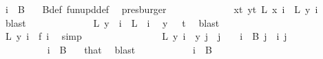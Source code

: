\begin{isabellebody}
\ {\isacartoucheopen}i\ {\isasymin}\ B\ {}{\isacartoucheclose}\ \isamarkupfalse%
\ B{\isacharunderscore}{\kern0pt}def\ fun{\isacharunderscore}{\kern0pt}upd{\isacharunderscore}{\kern0pt}def\ \isamarkupfalse%
\ presburger\isanewline
\ \ \ \ \ \ \ \ \ \ \isamarkupfalse%
\ \isamarkupfalse%
\ {\isachardoublequoteopen}{\isacharparenleft}{\kern0pt}{\isasymforall}x{\isacharless}{\kern0pt}t{\isachardot}{\kern0pt}\ {\isasymforall}y{\isacharless}{\kern0pt}t{\isachardot}{\kern0pt}\ L\ x\ i\ {\isacharequal}{\kern0pt}\ L\ y\ i{\isacharparenright}{\kern0pt}{\isachardoublequoteclose}\ \isamarkupfalse%
\ blast\isanewline
\ \ \ \ \ \ \ \ \ \ \isamarkupfalse%
\ \isamarkupfalse%
\ {\isachardoublequoteopen}L\ {\isacharparenleft}{\kern0pt}y\ {}{\isacharparenright}{\kern0pt}\ i\ {\isacharequal}{\kern0pt}\ L\ {}\ i{\isachardoublequoteclose}\ \isamarkupfalse%
\ {\isacartoucheopen}y\ {}\ {\isasymin}\ {\isacharbraceleft}{\kern0pt}{\isachardot}{\kern0pt}{\isachardot}{\kern0pt}{\isacharless}{\kern0pt}t{\isacharbraceright}{\kern0pt}{\isacartoucheclose}\ \isamarkupfalse%
\ blast\isanewline
\ \ \ \ \ \ \ \ \isamarkupfalse%
\isanewline
\ \ \ \ \ \ \ \ \isamarkupfalse%
\ \isamarkupfalse%
\ {\isachardoublequoteopen}{\isacharquery}{\kern0pt}L\ y\ i\ {\isacharequal}{\kern0pt}\ {\isacharquery}{\kern0pt}f\ i{\isachardoublequoteclose}\ \isamarkupfalse%
\ simp\isanewline
\ \ \ \ \ \ \isamarkupfalse%
\isanewline
\isanewline
\ \ \ \ \ \ \isamarkupfalse%
\ \isamarkupfalse%
\ {\isachardoublequoteopen}{\isacharparenleft}{\kern0pt}{\isacharquery}{\kern0pt}L\ y{\isacharparenright}{\kern0pt}\ i\ {\isacharequal}{\kern0pt}\ y\ j{\isachardoublequoteclose}\ \ {\isachardoublequoteopen}j\ {\isacharless}{\kern0pt}\ {}{\isachardoublequoteclose}\ \ {\isachardoublequoteopen}i\ {\isasymin}\ B\ j{\isachardoublequoteclose}\ \ i\ j\isanewline
\ \ \ \ \ \ \isamarkupfalse%
{\isacharminus}{\kern0pt}\isanewline
\ \ \ \ \ \ \ \ \isamarkupfalse%
\ {\isachardoublequoteopen}i\ {\isasymin}\ B\ {}{\isachardoublequoteclose}\ \isamarkupfalse%
\ that\ \isamarkupfalse%
\ blast\isanewline
\ \ \ \ \ \ \ \ \isamarkupfalse%
\ \isamarkupfalse%
\ {\isachardoublequoteopen}i\ {\isasymin}\ {\isacharquery}{\kern0pt}B{}{\isachardoublequoteclose}\ \isamarkupfalse%

\end{isabellebody}
